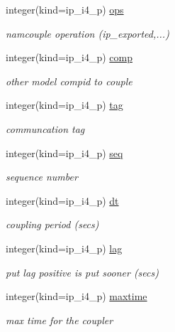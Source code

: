 \begin{DoxyCompactItemize}
integer(kind=ip\+\_\+i4\+\_\+p) \hyperlink{structmod__oasis__coupler_1_1prism__coupler__type_ac041ba5de191fa34468f61a674dd5bac}{ops}
\begin{DoxyCompactList}\small\item\em namcouple operation (ip\+\_\+exported,...) \end{DoxyCompactList}\item 
integer(kind=ip\+\_\+i4\+\_\+p) \hyperlink{structmod__oasis__coupler_1_1prism__coupler__type_a77cc2858814776053af5f3958d29fee2}{comp}
\begin{DoxyCompactList}\small\item\em other model compid to couple \end{DoxyCompactList}\item 
integer(kind=ip\+\_\+i4\+\_\+p) \hyperlink{structmod__oasis__coupler_1_1prism__coupler__type_a3b8e0d2cd3f3001b4c82e7a911008a37}{tag}
\begin{DoxyCompactList}\small\item\em communcation tag \end{DoxyCompactList}\item 
integer(kind=ip\+\_\+i4\+\_\+p) \hyperlink{structmod__oasis__coupler_1_1prism__coupler__type_af1766ab1d9fe55670c551a9d0c7f2e00}{seq}
\begin{DoxyCompactList}\small\item\em sequence number \end{DoxyCompactList}\item 
integer(kind=ip\+\_\+i4\+\_\+p) \hyperlink{structmod__oasis__coupler_1_1prism__coupler__type_ae1c1191f9aa4664aac2b819d1648320d}{dt}
\begin{DoxyCompactList}\small\item\em coupling period (secs) \end{DoxyCompactList}\item 
integer(kind=ip\+\_\+i4\+\_\+p) \hyperlink{structmod__oasis__coupler_1_1prism__coupler__type_a5f95dd90844b18f8c619df9371a556c6}{lag}
\begin{DoxyCompactList}\small\item\em put lag positive is put sooner (secs) \end{DoxyCompactList}\item 
integer(kind=ip\+\_\+i4\+\_\+p) \hyperlink{structmod__oasis__coupler_1_1prism__coupler__type_abe7dd91c4d011f5717e203191b7788e3}{maxtime}
\begin{DoxyCompactList}\small\item\em max time for the coupler \end{DoxyCompactList}\item 

\end{DoxyCompactItemize}
